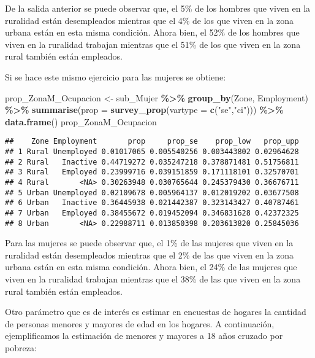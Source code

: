 \documentclass[
  12pt,
]{book}
\newenvironment{Shaded}{\begin{snugshade}}{\end{snugshade}}
\newcommand{\AttributeTok}[1]{\textcolor[rgb]{0.13,0.29,0.53}{#1}}
\newcommand{\FunctionTok}[1]{\textcolor[rgb]{0.13,0.29,0.53}{\textbf{#1}}}
\newcommand{\NormalTok}[1]{#1}
\newcommand{\OtherTok}[1]{\textcolor[rgb]{0.56,0.35,0.01}{#1}}
\newcommand{\SpecialCharTok}[1]{\textcolor[rgb]{0.81,0.36,0.00}{\textbf{#1}}}
\newcommand{\StringTok}[1]{\textcolor[rgb]{0.31,0.60,0.02}{#1}}
\begin{document}
De la salida anterior se puede observar que, el 5\% de los hombres que viven en la ruralidad están desempleados mientras que el 4\% de los que viven en la zona urbana están en esta misma condición. Ahora bien, el 52\% de los hombres que viven en la ruralidad trabajan mientras que el 51\% de los que viven en la zona rural también están empleados.

Si se hace este mismo ejercicio para las mujeres se obtiene:

\begin{Shaded}
\begin{Highlighting}[]
\NormalTok{prop\_ZonaM\_Ocupacion }\OtherTok{\textless{}{-}}\NormalTok{ sub\_Mujer }\SpecialCharTok{\%\textgreater{}\%} 
                        \FunctionTok{group\_by}\NormalTok{(Zone, Employment) }\SpecialCharTok{\%\textgreater{}\%} 
                        \FunctionTok{summarise}\NormalTok{(}\AttributeTok{prop =} \FunctionTok{survey\_prop}\NormalTok{(}\AttributeTok{vartype =} \FunctionTok{c}\NormalTok{(}\StringTok{"se"}\NormalTok{,}\StringTok{"ci"}\NormalTok{))) }\SpecialCharTok{\%\textgreater{}\%}
                        \FunctionTok{data.frame}\NormalTok{()}
\NormalTok{prop\_ZonaM\_Ocupacion}
\end{Highlighting}
\end{Shaded}

\begin{verbatim}
##    Zone Employment       prop     prop_se    prop_low   prop_upp
## 1 Rural Unemployed 0.01017065 0.005540256 0.003443802 0.02964628
## 2 Rural   Inactive 0.44719272 0.035247218 0.378871481 0.51756811
## 3 Rural   Employed 0.23999716 0.039151859 0.171118101 0.32570701
## 4 Rural       <NA> 0.30263948 0.030765644 0.245379430 0.36676711
## 5 Urban Unemployed 0.02109678 0.005964137 0.012019202 0.03677508
## 6 Urban   Inactive 0.36445938 0.021442387 0.323143427 0.40787461
## 7 Urban   Employed 0.38455672 0.019452094 0.346831628 0.42372325
## 8 Urban       <NA> 0.22988711 0.013850398 0.203613820 0.25845036
\end{verbatim}

Para las mujeres se puede observar que, el 1\% de las mujeres que viven en la ruralidad están desempleados mientras que el 2\% de las que viven en la zona urbana están en esta misma condición. Ahora bien, el 24\% de las mujeres que viven en la ruralidad trabajan mientras que el 38\% de las que viven en la zona rural también están empleados.

Otro parámetro que es de interés es estimar en encuestas de hogares la cantidad de personas menores y mayores de edad en los hogares. A continuación, ejemplificamos la estimación de menores y mayores a 18 años cruzado por pobreza:
\end{document}
